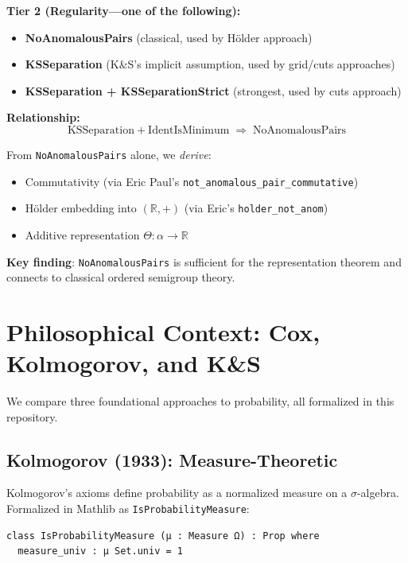 \documentclass[11pt]{article}
\theoremstyle{definition}
\theoremstyle{remark}
\begin{document}
\textbf{Tier 2 (Regularity---one of the following):}
\begin{itemize}
\item \textbf{NoAnomalousPairs} (classical, used by H\"older approach)
\item \textbf{KSSeparation} (K\&S's implicit assumption, used by grid/cuts approaches)
\item \textbf{KSSeparation + KSSeparationStrict} (strongest, used by cuts approach)
\end{itemize}

\textbf{Relationship:}
\[
\text{KSSeparation} + \text{IdentIsMinimum} \;\Rightarrow\; \text{NoAnomalousPairs}
\]

From \texttt{NoAnomalousPairs} alone, we \emph{derive}:
\begin{itemize}
\item Commutativity (via Eric Paul's \texttt{not\_anomalous\_pair\_commutative})
\item H\"older embedding into $(\mathbb{R}, +)$ (via Eric's \texttt{holder\_not\_anom})
\item Additive representation $\Theta : \alpha \to \mathbb{R}$
\end{itemize}

\textbf{Key finding}: \texttt{NoAnomalousPairs} is sufficient for the representation theorem and connects to classical ordered semigroup theory.

\section{Philosophical Context: Cox, Kolmogorov, and K\&S}
\label{app:philosophy}

We compare three foundational approaches to probability, all formalized in this repository.

\subsection{Kolmogorov (1933): Measure-Theoretic}

Kolmogorov's axioms define probability as a normalized measure on a $\sigma$-algebra.
Formalized in Mathlib as \texttt{IsProbabilityMeasure}:

\begin{lstlisting}[caption={Kolmogorov probability in Mathlib}]
class IsProbabilityMeasure (μ : Measure Ω) : Prop where
  measure_univ : μ Set.univ = 1
\end{lstlisting}
\end{document}
